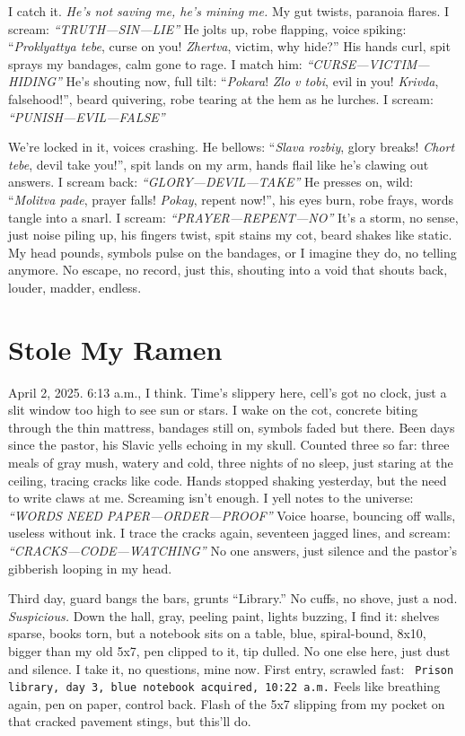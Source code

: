\documentclass[12pt]{article} %
\newcommand{\note}[1]{\texttt{\small \color{DarkGray} #1}}
\begin{document}
I catch it. \textit{He’s not saving me, he’s mining me.} My gut twists, paranoia flares. I scream: \textit{“TRUTH—SIN—LIE”} He jolts up, robe flapping, voice spiking: “\textit{Proklyattya tebe}, curse on you! \textit{Zhertva}, victim, why hide?” His hands curl, spit sprays my bandages, calm gone to rage. I match him: \textit{“CURSE—VICTIM—HIDING”} He’s shouting now, full tilt: “\textit{Pokara}! \textit{Zlo v tobi}, evil in you! \textit{Krivda}, falsehood!”, beard quivering, robe tearing at the hem as he lurches. I scream: \textit{“PUNISH—EVIL—FALSE”}

We’re locked in it, voices crashing. He bellows: “\textit{Slava rozbiy}, glory breaks! \textit{Chort tebe}, devil take you!”, spit lands on my arm, hands flail like he’s clawing out answers. I scream back: \textit{“GLORY—DEVIL—TAKE”} He presses on, wild: “\textit{Molitva pade}, prayer falls! \textit{Pokay}, repent now!”, his eyes burn, robe frays, words tangle into a snarl. I scream: \textit{“PRAYER—REPENT—NO”} It’s a storm, no sense, just noise piling up, his fingers twist, spit stains my cot, beard shakes like static. My head pounds, symbols pulse on the bandages, or I imagine they do, no telling anymore. No escape, no record, just this, shouting into a void that shouts back, louder, madder, endless.

\section{Stole My Ramen}

April 2, 2025. 6:13 a.m., I think. Time’s slippery here, cell’s got no clock, just a slit window too high to see sun or stars. I wake on the cot, concrete biting through the thin mattress, bandages still on, symbols faded but there. Been days since the pastor, his Slavic yells echoing in my skull. Counted three so far: three meals of gray mush, watery and cold, three nights of no sleep, just staring at the ceiling, tracing cracks like code. Hands stopped shaking yesterday, but the need to write claws at me. Screaming isn’t enough. I yell notes to the universe: \textit{“WORDS NEED PAPER—ORDER—PROOF”} Voice hoarse, bouncing off walls, useless without ink. I trace the cracks again, seventeen jagged lines, and scream: \textit{“CRACKS—CODE—WATCHING”} No one answers, just silence and the pastor’s gibberish looping in my head.

Third day, guard bangs the bars, grunts “Library.” No cuffs, no shove, just a nod. \textit{Suspicious.} Down the hall, gray, peeling paint, lights buzzing, I find it: shelves sparse, books torn, but a notebook sits on a table, blue, spiral-bound, 8x10, bigger than my old 5x7, pen clipped to it, tip dulled. No one else here, just dust and silence. I take it, no questions, mine now. First entry, scrawled fast: \note{Prison library, day 3, blue notebook acquired, 10:22 a.m.} Feels like breathing again, pen on paper, control back. Flash of the 5x7 slipping from my pocket on that cracked pavement stings, but this’ll do.
\end{document}
